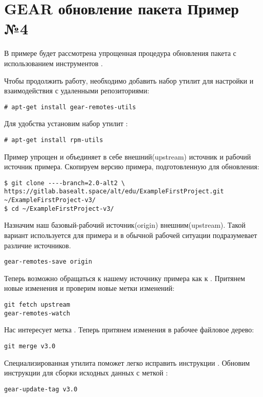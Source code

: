 \section{GEAR обновление пакета \textbf{Пример №4}}

В примере будет рассмотрена упрощенная процедура обновления пакета с
использованием инструментов .

Чтобы продолжить работу, необходимо добавить набор утилит  для
настройки и взаимодействия с удаленными репозиториями:
\begin{verbatim}
# apt-get install gear-remotes-utils
\end{verbatim}

Для удобства установим набор утилит :
\begin{verbatim}
# apt-get install rpm-utils
\end{verbatim}

Пример упрощен и объединяет в себе внешний(upstream) источник и
рабочий источник примера. Скопируем версию примера, подготовленную для
обновления:
\begin{verbatim}
$ git clone ----branch=2.0-alt2 \
https://gitlab.basealt.space/alt/edu/ExampleFirstProject.git ~/ExampleFirstProject-v3/
$ cd ~/ExampleFirstProject-v3/
\end{verbatim}

Назначим наш базовый-рабочий источник(origin) внешним(upstream). Такой вариант
используется для примера и в обычной рабочей ситуации подразумевает различие источников.
\begin{verbatim}
gear-remotes-save origin
\end{verbatim}

Теперь возможно обращаться к нашему источнику примера как к .
Притянем новые изменения и проверим новые метки изменений:
\begin{verbatim}
git fetch upstream
gear-remotes-watch
\end{verbatim}

Нас интересует метка . Теперь притянем изменения в рабочее файловое дерево:
\begin{verbatim}
git merge v3.0
\end{verbatim}

Специализированная утилита поможет легко исправить инструкции
.
Обновим инструкции для сборки исходных данных с меткой :
\begin{verbatim}
gear-update-tag v3.0
\end{verbatim}

